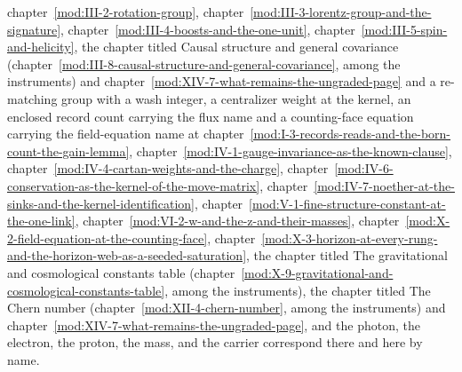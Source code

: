\begin{chbridge}
chapter~\ref{mod:III-2-rotation-group}, chapter~\ref{mod:III-3-lorentz-group-and-the-signature}, chapter~\ref{mod:III-4-boosts-and-the-one-unit}, chapter~\ref{mod:III-5-spin-and-helicity}, the chapter titled Causal structure and general covariance (chapter~\ref{mod:III-8-causal-structure-and-general-covariance}, among the instruments) and chapter~\ref{mod:XIV-7-what-remains-the-ungraded-page} and a re-matching group with a wash integer, a centralizer weight at the kernel, an enclosed record count carrying the flux name and a counting-face equation carrying the field-equation name at chapter~\ref{mod:I-3-records-reads-and-the-born-count-the-gain-lemma}, chapter~\ref{mod:IV-1-gauge-invariance-as-the-known-clause}, chapter~\ref{mod:IV-4-cartan-weights-and-the-charge}, chapter~\ref{mod:IV-6-conservation-as-the-kernel-of-the-move-matrix}, chapter~\ref{mod:IV-7-noether-at-the-sinks-and-the-kernel-identification}, chapter~\ref{mod:V-1-fine-structure-constant-at-the-one-link}, chapter~\ref{mod:VI-2-w-and-the-z-and-their-masses}, chapter~\ref{mod:X-2-field-equation-at-the-counting-face}, chapter~\ref{mod:X-3-horizon-at-every-rung-and-the-horizon-web-as-a-seeded-saturation}, the chapter titled The gravitational and cosmological constants table (chapter~\ref{mod:X-9-gravitational-and-cosmological-constants-table}, among the instruments), the chapter titled The Chern number (chapter~\ref{mod:XII-4-chern-number}, among the instruments) and chapter~\ref{mod:XIV-7-what-remains-the-ungraded-page}, and the photon, the electron, the proton, the mass, and the carrier correspond there and here by name.
\end{chbridge}
